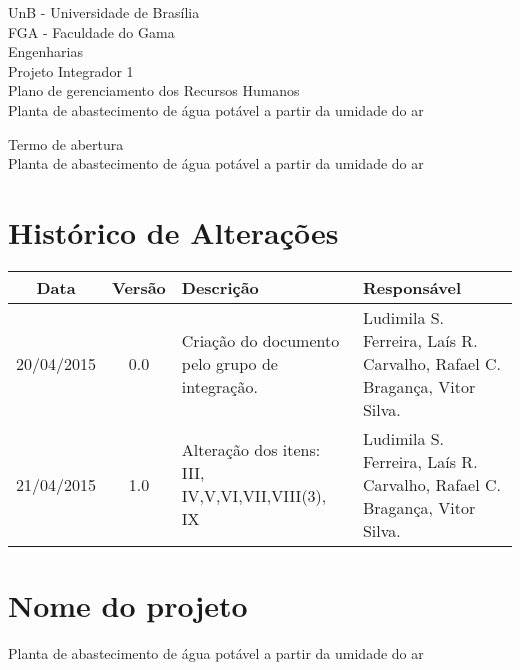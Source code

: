 \documentclass[12pt,openright,oneside,a4paper,brazil]{abntex2}
\title{}
\author{}
\begin{document}
\begin{capa}
 \begin{center}
  {\large UnB - Universidade de Brasília}\\[0.2cm]
  {\large FGA - Faculdade do Gama}\\[0.2cm]
  {\large Engenharias}\\[0.2cm]
  {\large Projeto Integrador 1}\\[5.1cm]
  {\large \Huge Plano de gerenciamento dos Recursos Humanos}\\[2.0cm]
  {\large \huge Planta de abastecimento de água potável a partir da umidade do ar}
 \end{center}

\end{capa}

\textual
\begin{center}
 {\large Termo de abertura}\\[0.2cm]
 {Planta de abastecimento de água potável a partir da umidade do ar}\\
 \end{center}
 
 \section{Histórico de Alterações}
\begin{table}[h]
\centering
\begin{tabular}{|c|c|p{6cm}|p{5cm}|}

Data & Versão & Descrição & Responsável\\
\hline                               
20/04/2015 & 0.0 & Criação do documento pelo grupo de integração. & Ludimila S. Ferreira,
Laís R. Carvalho, Rafael C. Bragança, Vitor Silva.\\
\hline
21/04/2015 & 1.0 & Alteração dos itens: III, IV,V,VI,VII,VIII(3), IX & Ludimila S. Ferreira,
Laís R. Carvalho, Rafael C. Bragança, Vitor Silva.\\
\hline
\end{tabular}
\end{table}

\section{Nome do projeto}
  Planta de abastecimento de água potável a partir da umidade do ar
  
\end{document}
